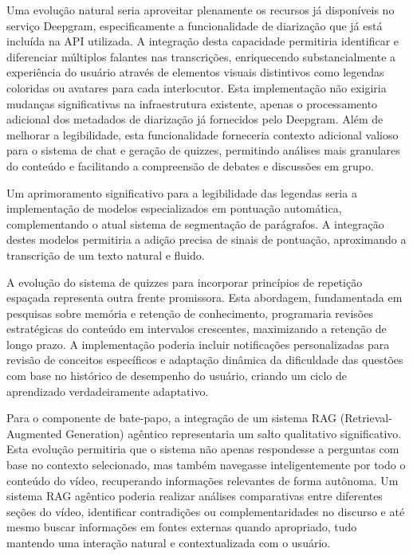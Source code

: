 \documentclass[tcc,capa]{texufpel}
\begin{document}
Uma evolução natural seria aproveitar plenamente os recursos já disponíveis no serviço Deepgram, especificamente a funcionalidade de diarização que já está incluída na API utilizada. A integração desta capacidade permitiria identificar e diferenciar múltiplos falantes nas transcrições, enriquecendo substancialmente a experiência do usuário através de elementos visuais distintivos como legendas coloridas ou avatares para cada interlocutor. Esta implementação não exigiria mudanças significativas na infraestrutura existente, apenas o processamento adicional dos metadados de diarização já fornecidos pelo Deepgram. Além de melhorar a legibilidade, esta funcionalidade forneceria contexto adicional valioso para o sistema de chat e geração de quizzes, permitindo análises mais granulares do conteúdo e facilitando a compreensão de debates e discussões em grupo.

Um aprimoramento significativo para a legibilidade das legendas seria a implementação de modelos especializados em pontuação automática, complementando o atual sistema de segmentação de parágrafos. A integração destes modelos permitiria a adição precisa de sinais de pontuação, aproximando a transcrição de um texto natural e fluido. 

A evolução do sistema de quizzes para incorporar princípios de repetição espaçada representa outra frente promissora. Esta abordagem, fundamentada em pesquisas sobre memória e retenção de conhecimento, programaria revisões estratégicas do conteúdo em intervalos crescentes, maximizando a retenção de longo prazo. A implementação poderia incluir notificações personalizadas para revisão de conceitos específicos e adaptação dinâmica da dificuldade das questões com base no histórico de desempenho do usuário, criando um ciclo de aprendizado verdadeiramente adaptativo.

Para o componente de bate-papo, a integração de um sistema RAG (Retrieval-Augmented Generation) agêntico representaria um salto qualitativo significativo. Esta evolução permitiria que o sistema não apenas respondesse a perguntas com base no contexto selecionado, mas também navegasse inteligentemente por todo o conteúdo do vídeo, recuperando informações relevantes de forma autônoma. Um sistema RAG agêntico poderia realizar análises comparativas entre diferentes seções do vídeo, identificar contradições ou complementaridades no discurso e até mesmo buscar informações em fontes externas quando apropriado, tudo mantendo uma interação natural e contextualizada com o usuário.
\end{document}
